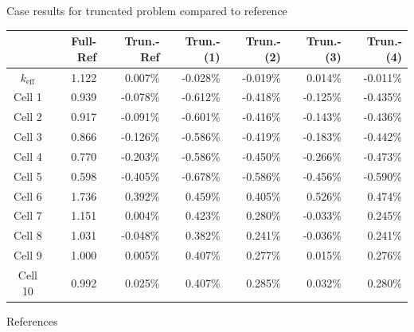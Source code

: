 \documentclass[final]{beamer}
\begin{document}
\begin{frame}{}
\begin{columns}[t]
\begin{column}{.32\linewidth}
\begin{block}{Case results for truncated problem compared to reference}
                \begin{tabular}{c|r|r|r|r|r|r}
                & Full-Ref & Trun.-Ref & Trun.-(1) &  Trun.-(2)  &  Trun.-(3)  &  Trun.-(4)  \\
                \hline
                $k_{\text{eff}}$& 1.122 &  0.007\% & -0.028\% & -0.019\% &  0.014\% & -0.011\%\\
                \hline
                Cell 1&  0.939 & -0.078\% & -0.612\% & -0.418\% & -0.125\% & -0.435\%\\
                Cell 2&  0.917 & -0.091\% & -0.601\% & -0.416\% & -0.143\% & -0.436\%\\
                Cell 3&  0.866 & -0.126\% & -0.586\% & -0.419\% & -0.183\% & -0.442\%\\
                Cell 4&  0.770 & -0.203\% & -0.586\% & -0.450\% & -0.266\% & -0.473\%\\
                Cell 5&  0.598 & -0.405\% & -0.678\% & -0.586\% & -0.456\% & -0.590\%\\
                Cell 6&  1.736 &  0.392\% &  0.459\% &  0.405\% &  0.526\% &  0.474\%\\
                Cell 7&  1.151 &  0.004\% &  0.423\% &  0.280\% & -0.033\% &  0.245\%\\
                Cell 8&  1.031 & -0.048\% &  0.382\% &  0.241\% & -0.036\% &  0.241\%\\
                Cell 9&  1.000 &  0.005\% &  0.407\% &  0.277\% &  0.015\% &  0.276\%\\
                Cell 10& 0.992 &  0.025\% &  0.407\% &  0.285\% &  0.032\% &  0.280\%\\
                \hline
                \end{tabular}
            \end{block}
            \vspace{0.1eX}
            \begin{block}{\large References} 
                
                \small
                
            \end{block}
        \end{column}
    \end{columns}
  \end{frame}
\end{document}
